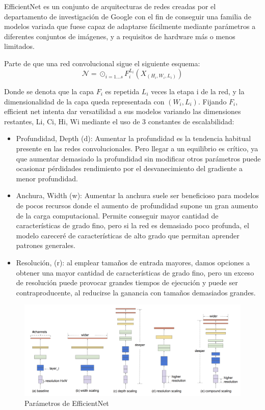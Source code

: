 EfficientNet \cite{Chaturvedi_2020} es un conjunto de arquitecturas de redes creadas por el departamento de investigación de Google con el fin de conseguir una familia de modelos variada que fuese capaz de adaptarse fácilmente mediante parámetros a diferentes conjuntos de imágenes, y a requisitos de hardware más o menos limitados. 

Parte de que una red convolucional sigue el siguiente esquema:
$$\mathcal{N}=\odot_{i=1...s} F_i^{L_i}(X_{(H_i, W_i,L_i)})$$


Donde se denota que la capa $F_i$ es repetida $L_i$ veces la etapa i de la red, y la dimensionalidad de la capa queda representada con ${( W_i,L_i)}$.  Fijando $F_i$, efficient net intenta dar versatilidad a sus modelos variando las dimensiones restantes, Li, Ci, Hi, Wi mediante el uso de 3 constantes de escalabilidad:

\begin{itemize}
	 \item  Profundidad, Depth (d):  Aumentar la profundidad es la tendencia habitual presente en las redes convolucionales. Pero llegar a un equilibrio es crítico, ya que aumentar demasiado la profundidad sin modificar otros parámetros puede ocasionar pérdidades rendimiento por el desvanecimiento del gradiente  a menor profundidad. 
	\item Anchura, Width (w): Aumentar la anchura suele ser beneficioso para modelos de pocos recursos donde el aumento de profundidad supone un gran aumento de la carga computacional. Permite conseguir mayor cantidad de características de grado fino, pero si la red es demasiado poco profunda, el modelo careceré de características de alto grado que permitan aprender patrones generales.
	\item Resolución, (r): al emplear tamaños de entrada mayores, damos opciones a obtener una mayor cantidad de características de grado fino, pero un exceso de resolución puede provocar grandes tiempos de ejecución y puede ser contraproducente, al reducirse la ganancia con tamaños demasiados grandes.
\end{itemize}

\begin{figure}[H]
	\label{arquitecturashuffle}
	\centering
	\includegraphics[scale = 0.2]{imagenes/efnet_scale.png}
	\caption{Parámetros de EfficientNet}
\end{figure}



